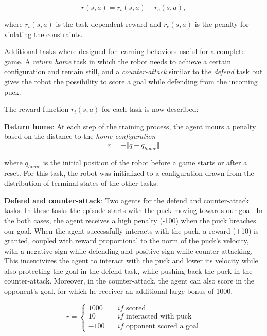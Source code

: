 \begin{equation*}
    r(s,a) = r_t(s,a) + r_c(s,a),
\end{equation*}

where $r_t(s,a)$ is the task-dependent reward and $r_c(s,a)$ is the penalty for violating the constraints.

Additional tasks where designed for learning behaviors useful for a complete game. A \textit{return home} task in which the robot needs to achieve a certain configuration and remain still,
and a \textit{counter-attack} similar to the \textit{defend} task but gives the robot the possibility to score a goal while defending from the incoming puck.

The reward function $r_t(s,a)$ for each task is now described:

\textbf{Return home}: At each step of the training process, the agent incurs a penalty based on the distance to the \textit{home configuration}
\begin{equation*}
    r = - \Vert q - q_{home} \Vert
\end{equation*}

where $q_{home}$ is the initial position of the robot before a game starts or after a reset. For this task, the robot was initialized to a configuration
drawn from the distribution of terminal states of the other tasks.

\textbf{Defend and counter-attack}: 
Two agents for the defend and counter-attack tasks. In these
tasks the episode starts with the puck moving towards our goal. In the both cases, the agent receives a
high penalty (-100) when the puck breaches our goal. When the agent successfully interacts with the
puck, a reward (+10) is granted, coupled with reward proportional to the norm of the puck's velocity,
with a negative sign while defending and positive sign while counter-attacking. This incentivizes the
agent to interact with the puck and lower its velocity while also protecting the goal in the defend task,
while pushing back the puck in the counter-attack. Moreover, in the counter-attack, the agent can also
score in the opponent's goal, for which he receiver an additional large bonus of 1000.

\begin{equation*}
    r = \left\{
        \begin{aligned}
            1000 \quad &if \text{ scored} \\
            10  \quad &if \text{ interacted with puck} \\
            -100 \quad &if \text{ opponent scored a goal}
        \end{aligned}
    \right.
\end{equation*}

